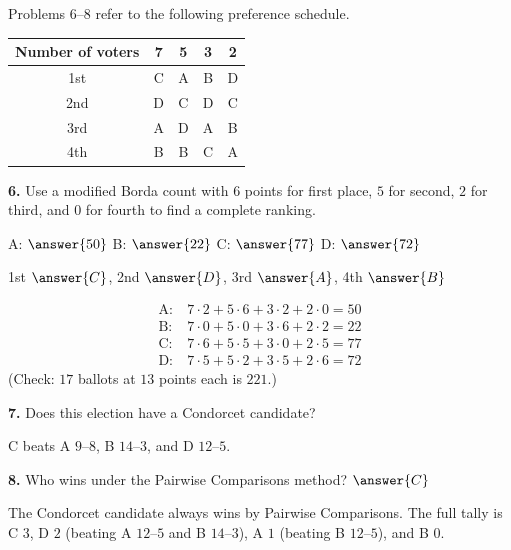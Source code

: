 \documentclass[12pt]{ximera}
\begin{document}
\begin{problem}
Problems 6--8 refer to the following preference schedule.
\begin{center}
\begin{tabular}{c|cccc}
Number of voters & 7 & 5 & 3 & 2\\\hline
1st & C & A & B & D\\
2nd & D & C & D & C\\
3rd & A & D & A & B\\
4th & B & B & C & A
\end{tabular}
\end{center}

\begin{prompt}
\textbf{6.} Use a modified Borda count with $6$ points for first place, $5$ for second,
$2$ for third, and $0$ for fourth to find a complete ranking.

A: $\answer{50}$ \quad B: $\answer{22}$ \quad C: $\answer{77}$ \quad D: $\answer{72}$

\smallskip
1st $\answer{C}$, 2nd $\answer{D}$, 3rd $\answer{A}$, 4th $\answer{B}$

\begin{feedback}
\[
\begin{aligned}
\text{A:}&\ 7\cdot2+5\cdot6+3\cdot2+2\cdot0=50\\
\text{B:}&\ 7\cdot0+5\cdot0+3\cdot6+2\cdot2=22\\
\text{C:}&\ 7\cdot6+5\cdot5+3\cdot0+2\cdot5=77\\
\text{D:}&\ 7\cdot5+5\cdot2+3\cdot5+2\cdot6=72
\end{aligned}
\]
(Check: $17$ ballots at $13$ points each is $221$.)
\end{feedback}
\end{prompt}

\begin{prompt}
\textbf{7.} Does this election have a Condorcet candidate?

\begin{multipleChoice}
\end{multipleChoice}

\begin{feedback}
C beats A $9$--$8$, B $14$--$3$, and D $12$--$5$.
\end{feedback}
\end{prompt}

\begin{prompt}
\textbf{8.} Who wins under the Pairwise Comparisons method? $\answer{C}$

\begin{feedback}
The Condorcet candidate always wins by Pairwise Comparisons. The full tally is C $3$,
D $2$ (beating A $12$--$5$ and B $14$--$3$), A $1$ (beating B $12$--$5$), and B $0$.
\end{feedback}
\end{prompt}
\end{problem}
\end{document}
